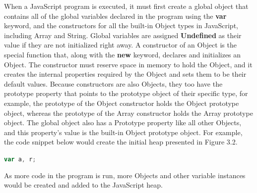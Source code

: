 \documentclass[a4paper,11pt,twoside]{report}
\def\jsinline{\lstinline[language=JavaScript, basicstyle=\small]}
\begin{document}
When a JavaScript program is executed, it must first create a global object that contains all of the global variables declared in the program using the \textbf{var} keyword, and the constructors for all the built-in Object types in JavaScript, including Array and String. Global variables are assigned \textbf{Undefined} as their value if they are not initialized right away. A constructor of an Object is the special function that, along with the \textbf{new} keyword, declares and initializes an Object. The constructor must reserve space in memory to hold the Object, and it creates the internal properties required by the Object and sets them to be their default values. Because constructors are also Objects, they too have the prototype property that points to the prototype object of their specific type, for example, the prototype of the Object constructor holds the Object prototype object, whereas the prototype of the Array constructor holds the Array prototype object. The global object also has a Prototype property like all other Objects, and this property's value is the built-in Object prototype object. For example, the code snippet below would create the initial heap presented in Figure 3.2.
\begin{center}
\jsinline|var a, r;|
\end{center}
As more code in the program is run, more Objects and other variable instances would be created and added to the JavaScript heap.
\end{document}

